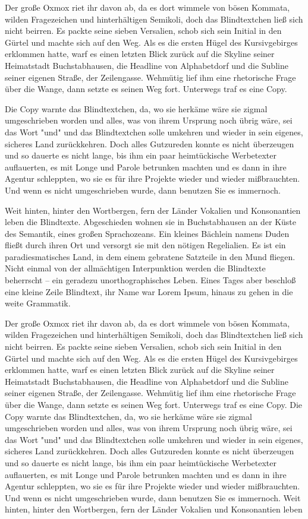 Der große Oxmox riet ihr davon ab, da es dort wimmele von bösen Kommata, wilden Fragezeichen und hinterhältigen Semikoli, doch das Blindtextchen ließ sich nicht beirren. Es packte seine sieben Versalien, schob sich sein Initial in den Gürtel und machte sich auf den Weg. Als es die ersten Hügel des Kursivgebirges erklommen hatte, warf es einen letzten Blick zurück auf die Skyline seiner Heimatstadt Buchstabhausen, die Headline von Alphabetdorf und die Subline seiner eigenen Straße, der Zeilengasse. Wehmütig lief ihm eine rhetorische Frage über die Wange, dann setzte es seinen Weg fort. Unterwegs traf es eine Copy.

Die Copy warnte das Blindtextchen, da, wo sie herkäme wäre sie zigmal umgeschrieben worden und alles, was von ihrem Ursprung noch übrig wäre, sei das Wort "und" und das Blindtextchen solle umkehren und wieder in sein eigenes, sicheres Land zurückkehren. Doch alles Gutzureden konnte es nicht überzeugen und so dauerte es nicht lange, bis ihm ein paar heimtückische Werbetexter auflauerten, es mit Longe und Parole betrunken machten und es dann in ihre Agentur schleppten, wo sie es für ihre Projekte wieder und wieder mißbrauchten. Und wenn es nicht umgeschrieben wurde, dann benutzen Sie es immernoch.

Weit hinten, hinter den Wortbergen, fern der Länder Vokalien und Konsonantien leben die Blindtexte. Abgeschieden wohnen sie in Buchstabhausen an der Küste des Semantik, eines großen Sprachozeans. Ein kleines Bächlein namens Duden fließt durch ihren Ort und versorgt sie mit den nötigen Regelialien. Es ist ein paradiesmatisches Land, in dem einem gebratene Satzteile in den Mund fliegen. Nicht einmal von der allmächtigen Interpunktion werden die Blindtexte beherrscht – ein geradezu unorthographisches Leben. Eines Tages aber beschloß eine kleine Zeile Blindtext, ihr Name war Lorem Ipsum, hinaus zu gehen in die weite Grammatik.

Der große Oxmox riet ihr davon ab, da es dort wimmele von bösen Kommata, wilden Fragezeichen und hinterhältigen Semikoli, doch das Blindtextchen ließ sich nicht beirren. Es packte seine sieben Versalien, schob sich sein Initial in den Gürtel und machte sich auf den Weg. Als es die ersten Hügel des Kursivgebirges erklommen hatte, warf es einen letzten Blick zurück auf die Skyline seiner Heimatstadt Buchstabhausen, die Headline von Alphabetdorf und die Subline seiner eigenen Straße, der Zeilengasse. Wehmütig lief ihm eine rhetorische Frage über die Wange, dann setzte es seinen Weg fort. Unterwegs traf es eine Copy. Die Copy warnte das Blindtextchen, da, wo sie herkäme wäre sie zigmal umgeschrieben worden und alles, was von ihrem Ursprung noch übrig wäre, sei das Wort "und" und das Blindtextchen solle umkehren und wieder in sein eigenes, sicheres Land zurückkehren. Doch alles Gutzureden konnte es nicht überzeugen und so dauerte es nicht lange, bis ihm ein paar heimtückische Werbetexter auflauerten, es mit Longe und Parole betrunken machten und es dann in ihre Agentur schleppten, wo sie es für ihre Projekte wieder und wieder mißbrauchten. Und wenn es nicht umgeschrieben wurde, dann benutzen Sie es immernoch. Weit hinten, hinter den Wortbergen, fern der Länder Vokalien und Konsonantien leben
